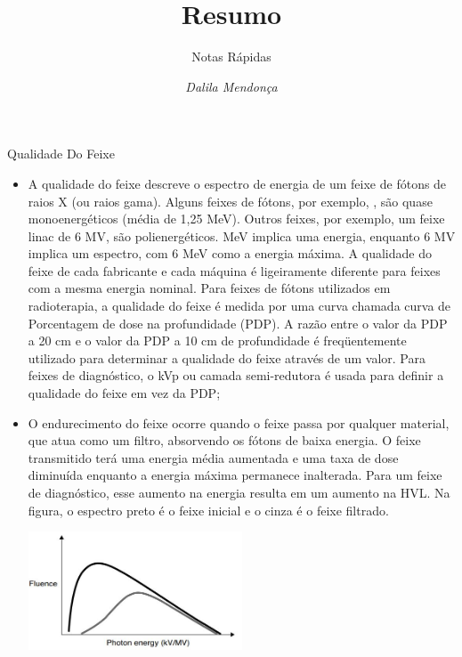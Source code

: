 \documentclass[11pt,a4paper]{article}
\title{Resumo}
\author{Notas Rápidas \nocite{*}}
\date{\textit{Dalila Mendonça}}
\newcounter{exemplo}
\begin{document}
	\maketitle
    
\begin{exemplo}
    \textcolor{CarnationPink}{Qualidade Do Feixe}
    \begin{itemize}
        \item A qualidade do feixe descreve o espectro de energia de um feixe de fótons de raios X (ou raios gama). Alguns feixes de fótons, por exemplo, , são quase monoenergéticos (média de 1,25 MeV). Outros feixes, por exemplo, um feixe linac de 6 MV, são polienergéticos. MeV implica uma energia, enquanto 6 MV implica um espectro, com 6 MeV como a energia máxima. A qualidade do feixe de cada fabricante e cada máquina é ligeiramente diferente para feixes com a mesma energia nominal. Para feixes de fótons utilizados em radioterapia, a qualidade do feixe é medida por uma curva chamada curva de Porcentagem de dose na profundidade (PDP). A razão entre o valor da PDP a 20 cm e o valor da PDP a 10 cm de profundidade é freqüentemente utilizado para determinar a qualidade do feixe através de um valor. Para feixes de diagnóstico, o kVp ou camada semi-redutora é usada para definir a qualidade do feixe em vez da PDP;
        
        \item O endurecimento do feixe ocorre quando o feixe passa por qualquer material, que atua como um filtro, absorvendo os fótons de baixa energia. O feixe transmitido terá uma energia média aumentada e uma taxa de dose diminuída enquanto a energia máxima permanece inalterada. Para um feixe de diagnóstico, esse aumento na energia resulta em um aumento na HVL. Na figura, o espectro preto é o feixe inicial e o cinza é o feixe filtrado.

        \begin{center}
            \includegraphics[width=0.5\textwidth]{Imagens/endurecimentoDoFeixe.JPG}
        \end{center}


\end{itemize}
\end{exemplo}
\end{document}
